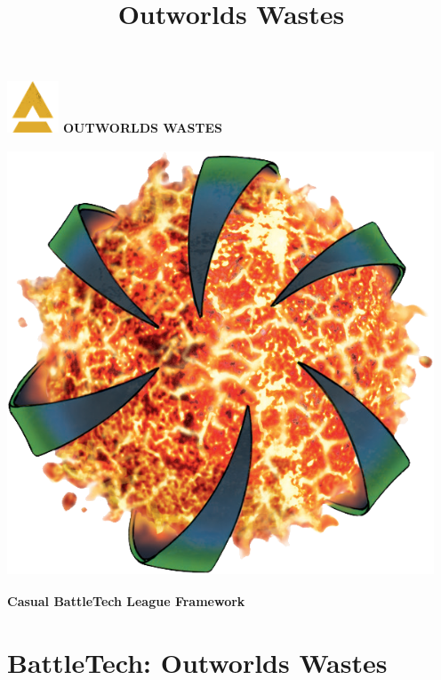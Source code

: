 \documentclass{article}
\title{Outworlds Wastes}
\begin{document}
\begin{center}
  \fontsize{50}{60}\bfseries{}\includegraphics[width=0.6in,height=0.6in]{img/Battletech_A.png}\fontsize{50}{60}\bfseries{}
  \fontsize{35}{42}\bfseries\selectfont\MakeUppercase{Outworlds Wastes}

  \includegraphics[width=5in,height=5in]{img/Outworlds_Alliance.png}

  \LARGE\bfseries{Casual BattleTech League Framework}
\end{center}

\section{BattleTech: Outworlds Wastes}



\newpage

\tableofcontents
\end{document}
